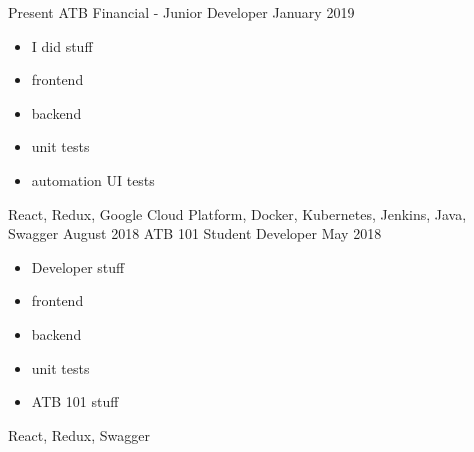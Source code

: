 %
%
%

\begin{experiences}
  \experience
    {Present}   
    {ATB Financial - Junior Developer}{}{}
    {January 2019} {
                      \begin{itemize}
                        \item I did stuff
                        \item frontend
                        \item backend
                        \item unit tests
                        \item automation UI tests
                      \end{itemize}
                  }
                    {
                      React,
                      Redux,
                      Google Cloud Platform,
                      Docker,
                      Kubernetes,
                      Jenkins,
                      Java,
                      Swagger
                    }
  \emptySeparator
  \experience
    {August 2018} {ATB 101 Student Developer} {} {}
    {May 2018}    {
                      \begin{itemize}
                        \item Developer stuff
                        \item frontend
                        \item backend
                        \item unit tests
                        \item ATB 101 stuff                                                              
                      \end{itemize}
                    }
                    {
                      React,
                      Redux,
                      Swagger
                    }
  
\end{experiences}
